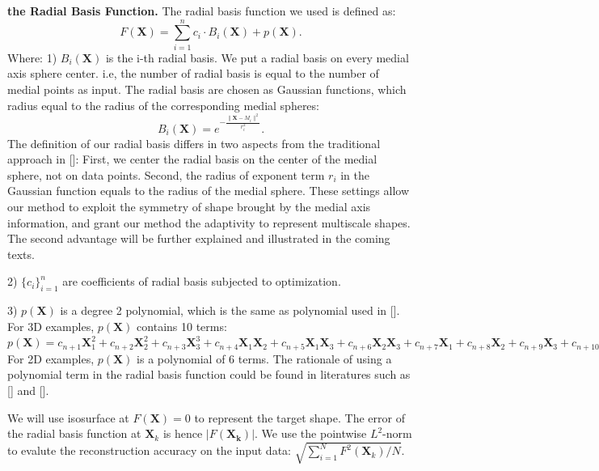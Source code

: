 \documentclass[annual]{acmsiggraph}
\begin{document}
\textbf{the Radial Basis Function. }
The radial basis function we used is defined as:
\begin{equation}
F(\mathbf{X})=\sum_{i=1}^nc_i\cdot B_i(\mathbf{X})+p(\mathbf{X}).
\end{equation}
Where:
1)  $B_i(\mathbf{X})$ is the i-th radial basis. We put a radial basis on every medial axis sphere center. i.e, the number of radial basis is equal to the number of medial points as input. The radial basis are chosen as Gaussian functions, which radius equal to the radius of the corresponding medial spheres:
\begin{equation}
B_i(\mathbf{X})=e^{-\frac{\|\mathbf{X}-M_i\|^2}{r_i^2}}.
\end{equation}
The definition of our radial basis differs in two aspects from the traditional approach in []: First, we center the radial basis on the center of the medial sphere, not on data points. Second, the radius of exponent term $r_i$ in the Gaussian function equals to the radius of the medial sphere. These settings allow our method to exploit the symmetry of shape brought by the medial axis information, and grant our method the adaptivity to represent multiscale shapes. The second advantage will be further explained and illustrated in the coming texts.

2) $\{c_i\}_{i=1}^n $  are coefficients of radial basis subjected to optimization.

3) $p(\mathbf{X})$ is a degree 2 polynomial, which is the same as polynomial used in []. For 3D examples, $p(\mathbf{X})$ contains 10 terms: $p(\mathbf{X})=c_{n+1}\mathbf{X}_1^2+c_{n+2}\mathbf{X}_2^2+c_{n+3}\mathbf{X}_3^3+c_{n+4}\mathbf{X}_1\mathbf{X}_2+c_{n+5}\mathbf{X}_1\mathbf{X}_3+
c_{n+6}\mathbf{X}_2\mathbf{X}_3+c_{n+7}\mathbf{X}_1+c_{n+8}\mathbf{X}_2+c_{n+9}\mathbf{X}_3+c_{n+10}.$ For 2D examples, $p(\mathbf{X})$ is a polynomial of 6 terms. The rationale of using a polynomial term in the radial basis function could be found in literatures such as [] and [].

We will use isosurface at $F(\mathbf{X})=0$ to represent the target shape. The error of the radial basis function at $\mathbf{X}_k$ is hence $|F(\mathbf{X_k})|$. We use the pointwise $L^2$-norm to evalute the reconstruction accuracy on the input data: $\sqrt{\sum_{i=1}^N F^2(\mathbf{X}_k)/N}$. 
\end{document}
